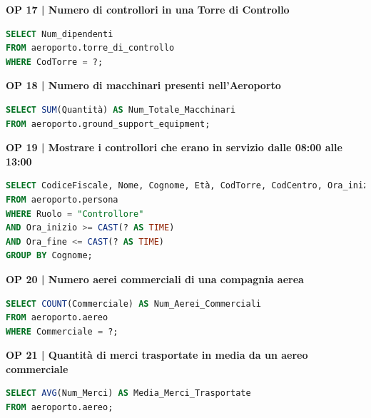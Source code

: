 \textbf{\small OP 17 | Numero di controllori in una Torre di Controllo}\\

\begin{lstlisting}[language=SQL]
SELECT Num_dipendenti
FROM aeroporto.torre_di_controllo
WHERE CodTorre = ?;	
\end{lstlisting}


\textbf{\small OP 18 | Numero di macchinari presenti nell'Aeroporto}\\

\begin{lstlisting}[language=SQL]
SELECT SUM(Quantità) AS Num_Totale_Macchinari
FROM aeroporto.ground_support_equipment;	
\end{lstlisting}


\textbf{\small OP 19 | Mostrare i controllori che erano in servizio dalle 08:00 alle 13:00}\\

\begin{lstlisting}[language=SQL]
SELECT CodiceFiscale, Nome, Cognome, Età, CodTorre, CodCentro, Ora_inizio, Ora_fine
FROM aeroporto.persona
WHERE Ruolo = "Controllore"
AND Ora_inizio >= CAST(? AS TIME)
AND Ora_fine <= CAST(? AS TIME)
GROUP BY Cognome;	
\end{lstlisting}


\textbf{\small OP 20 | Numero aerei commerciali di una compagnia aerea}\\

\begin{lstlisting}[language=SQL]
SELECT COUNT(Commerciale) AS Num_Aerei_Commerciali
FROM aeroporto.aereo
WHERE Commerciale = ?;
\end{lstlisting}


\textbf{\small OP 21 | Quantità di merci trasportate in media da un aereo commerciale}\\

\begin{lstlisting}[language=SQL]
SELECT AVG(Num_Merci) AS Media_Merci_Trasportate
FROM aeroporto.aereo;	
\end{lstlisting}